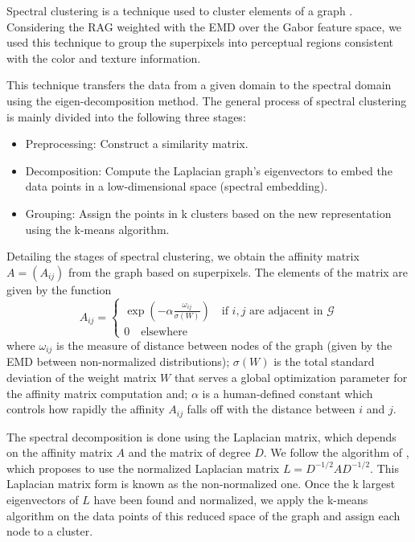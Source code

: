 Spectral clustering is a technique used to cluster elements of a graph \citep{Ng.Jordan.ea:NIPS:2001}. Considering the RAG weighted with the EMD over the Gabor feature space, we used this technique to group the superpixels into perceptual regions consistent with the color and texture information.

This technique transfers the data from a given domain to the spectral domain using the eigen-decomposition method. The general process of spectral clustering is mainly divided into the following three stages:

\begin{itemize}
	\item Preprocessing: Construct a similarity matrix.
	\item Decomposition: Compute the Laplacian graph's eigenvectors to embed the data points in a low-dimensional space (spectral embedding).
	\item Grouping: Assign the points in k clusters based on the new representation using the k-means algorithm.
\end{itemize}

Detailing the stages of spectral clustering, we obtain the affinity matrix $A = (A_{ij})$ from the graph based on superpixels. The elements of the matrix are given by the function
\begin{equation}	
	A_{ij}= 
	\begin{cases}
		\exp{\left(- \alpha \frac{\omega_{ij}}{\sigma(W)}\right)}  \quad \text{if $i, j$ are adjacent in $\mathcal{G}$} \\
		0 \quad \text{elsewhere}
	\end{cases}	 
\end{equation}
where $\omega_{ij}$ is the measure of distance between nodes of the graph (given by the EMD between non-normalized distributions); $\sigma(W)$ is the total standard deviation of the weight matrix $W$ that serves a global optimization parameter for the affinity matrix computation and; $\alpha$ is a human-defined constant which controls how rapidly the affinity $A_{ij}$ falls off with the distance between $i$ and $j$.

The spectral decomposition is done using the Laplacian matrix, which depends on the affinity matrix $A$ and the matrix of degree $D$. We follow the algorithm of \cite{Ng.Jordan.ea:NIPS:2001}, which proposes to use the normalized Laplacian matrix $L = D^{-1/2} A D^{-1/2}$. This Laplacian matrix form is known as the non-normalized one. Once the k largest eigenvectors of $ L $ have been found and normalized, we apply the k-means algorithm on the data points of this reduced space of the graph and assign each node to a cluster.

